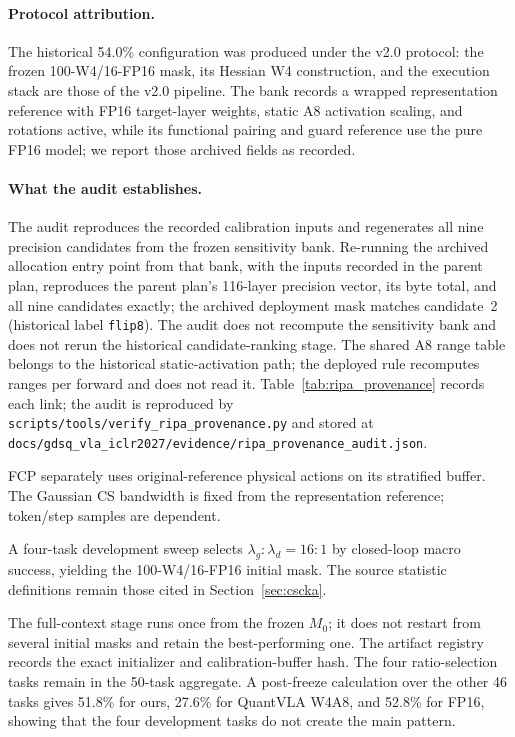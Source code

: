 \paragraph{Protocol attribution.}
The historical 54.0\% configuration was produced under the v2.0 protocol: the frozen 100-W4/16-FP16 mask, its Hessian W4 construction, and the \dyrange execution stack are those of the v2.0 pipeline. The bank records a wrapped representation reference with FP16 target-layer weights, static A8 activation scaling, and rotations active, while its functional pairing and guard reference use the pure FP16 model; we report those archived fields as recorded.

\paragraph{What the audit establishes.}
The audit reproduces the recorded calibration inputs and regenerates all nine precision candidates from the frozen sensitivity bank. Re-running the archived allocation entry point from that bank, with the inputs recorded in the parent plan, reproduces the parent plan's 116-layer precision vector, its byte total, and all nine candidates exactly; the archived deployment mask matches candidate~2 (historical label \texttt{flip8}). The audit does not recompute the sensitivity bank and does not rerun the historical candidate-ranking stage. The shared A8 range table belongs to the historical static-activation path; the deployed \dyrange rule recomputes ranges per forward and does not read it. Table~\ref{tab:ripa_provenance} records each link; the audit is reproduced by \nolinkurl{scripts/tools/verify_ripa_provenance.py} and stored at \nolinkurl{docs/gdsq_vla_iclr2027/evidence/ripa_provenance_audit.json}.



FCP separately uses original-reference physical actions on its stratified buffer. The Gaussian CS bandwidth is fixed from the representation reference; token/step samples are dependent.

A four-task development sweep selects $\lambda_g:\lambda_d=16:1$ by closed-loop macro success, yielding the 100-W4/16-FP16 initial mask. The source statistic definitions remain those cited in Section~\ref{sec:cscka}.

The full-context stage runs once from the frozen $M_0$; it does not restart from several initial masks and retain the best-performing one. The artifact registry records the exact initializer and calibration-buffer hash. The four ratio-selection tasks remain in the 50-task aggregate. A post-freeze calculation over the other 46 tasks gives 51.8\% for ours, 27.6\% for QuantVLA W4A8, and 52.8\% for FP16, showing that the four development tasks do not create the main pattern.

